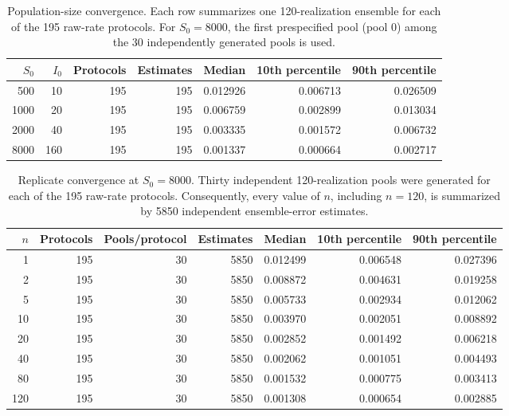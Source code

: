 \documentclass[11pt]{article}
\begin{document}
\begin{table}[H]
\caption{Population-size convergence. Each row summarizes one 120-realization ensemble for each of the 195 raw-rate protocols. For $S_0=8000$, the first prespecified pool (pool 0) among the 30 independently generated pools is used.}
\centering\footnotesize
\begin{tabular}{@{}rrrrrrr@{}}
\toprule
$S_0$ & $I_0$ & Protocols & Estimates & Median & 10th percentile & 90th percentile \\
\midrule
500 & 10 & 195 & 195 & 0.012926 & 0.006713 & 0.026509 \\
1000 & 20 & 195 & 195 & 0.006759 & 0.002899 & 0.013034 \\
2000 & 40 & 195 & 195 & 0.003335 & 0.001572 & 0.006732 \\
8000 & 160 & 195 & 195 & 0.001337 & 0.000664 & 0.002717 \\
\bottomrule
\end{tabular}
\end{table}

\begin{table}[H]
\caption{Replicate convergence at $S_0=8000$. Thirty independent 120-realization pools were generated for each of the 195 raw-rate protocols. Consequently, every value of $n$, including $n=120$, is summarized by 5850 independent ensemble-error estimates.}
\centering\footnotesize
\begin{tabular}{@{}rrrrrrr@{}}
\toprule
$n$ & Protocols & Pools/protocol & Estimates & Median & 10th percentile & 90th percentile \\
\midrule
1 & 195 & 30 & 5850 & 0.012499 & 0.006548 & 0.027396 \\
2 & 195 & 30 & 5850 & 0.008872 & 0.004631 & 0.019258 \\
5 & 195 & 30 & 5850 & 0.005733 & 0.002934 & 0.012062 \\
10 & 195 & 30 & 5850 & 0.003970 & 0.002051 & 0.008892 \\
20 & 195 & 30 & 5850 & 0.002852 & 0.001492 & 0.006218 \\
40 & 195 & 30 & 5850 & 0.002062 & 0.001051 & 0.004493 \\
80 & 195 & 30 & 5850 & 0.001532 & 0.000775 & 0.003413 \\
120 & 195 & 30 & 5850 & 0.001308 & 0.000654 & 0.002885 \\
\bottomrule
\end{tabular}
\end{table}
\end{document}
